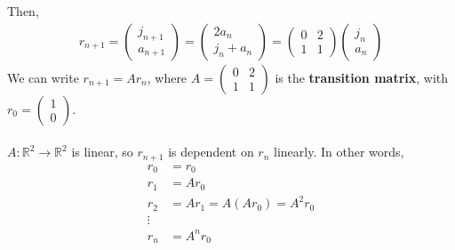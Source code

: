 \documentclass[letterpaper,12pt]{article}
\begin{document}
Then,
\begin{align*}
    r_{n+1} = \begin{pmatrix} j_{n+1} \\ a_{n+1} \end{pmatrix} = \begin{pmatrix} 2a_n \\ j_n + a_n \end{pmatrix} = \begin{pmatrix} 0 & 2 \\ 1 & 1 \end{pmatrix} \begin{pmatrix} j_n \\ a_n \end{pmatrix}
\end{align*}
We can write $r_{n+1} = Ar_n$, where $A = \begin{pmatrix} 0 & 2 \\ 1 & 1 \end{pmatrix}$ is the \textbf{transition matrix}, with $r_0 = \begin{pmatrix} 1 \\ 0 \end{pmatrix}$.
\\ \\ $A: \mathbb{R}^2 \rightarrow \mathbb{R}^2$ is linear, so $r_{n+1}$ is dependent on $r_n$ linearly. In other words,
\begin{align*}
    r_0 & = r_0\\
    r_1 & = Ar_0 \\
    r_2 & = Ar_1 = A(Ar_0) = A^2r_0 \\
    \vdots & \\
    r_n & = A^n r_0
\end{align*}
\end{document}

